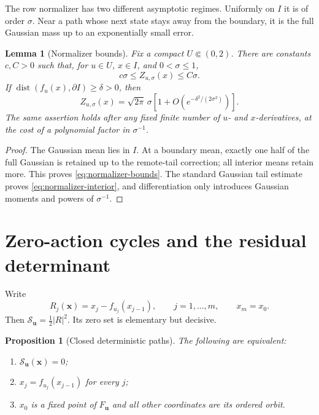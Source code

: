 \documentclass[11pt]{article}
\newtheorem{proposition}[theorem]{Proposition}
\newtheorem{lemma}[theorem]{Lemma}
\theoremstyle{remark}
\newcommand{\cS}{\mathcal S}
\newcommand{\bu}{\boldsymbol u}
\newcommand{\bx}{\boldsymbol x}
\begin{document}
The row normalizer has two different asymptotic regimes.  Uniformly on $I$ it
is of order $\sigma$.  Near a path whose next state stays away from the
boundary, it is the full Gaussian mass up to an exponentially small error.

\begin{lemma}[Normalizer bounds]
\label{lem:normalizer}
Fix a compact $U\Subset(0,2)$.  There are constants $c,C>0$ such that, for
$u\in U$, $x\in I$, and $0<\sigma\le1$,
\begin{equation}
 c\sigma\le Z_{u,\sigma}(x)\le C\sigma.
 \label{eq:normalizer-bounds}
\end{equation}
If $\operatorname{dist}(f_u(x),\partial I)\ge\delta>0$, then
\begin{equation}
 Z_{u,\sigma}(x)=\sqrt{2\pi}\,\sigma
 \left[1+O\left(e^{-\delta^2/(2\sigma^2)}\right)\right].
 \label{eq:normalizer-interior}
\end{equation}
The same assertion holds after any fixed finite number of $u$- and
$x$-derivatives, at the cost of a polynomial factor in $\sigma^{-1}$.
\end{lemma}

\begin{proof}
The Gaussian mean lies in $I$.  At a boundary mean, exactly one half of the
full Gaussian is retained up to the remote-tail correction; all interior means
retain more.  This proves \eqref{eq:normalizer-bounds}.  The standard Gaussian
tail estimate proves \eqref{eq:normalizer-interior}, and differentiation only
introduces Gaussian moments and powers of $\sigma^{-1}$.
\end{proof}

\section{Zero-action cycles and the residual determinant}
\label{sec:geometry}

Write
\begin{equation}
 R_j(\bx)=x_j-f_{u_j}(x_{j-1}),
 \qquad j=1,\ldots,m,\qquad x_m=x_0.
 \label{eq:residual}
\end{equation}
Then $\cS_{\bu}=\frac12|R|^2$.  Its zero set is elementary but decisive.

\begin{proposition}[Closed deterministic paths]
\label{prop:zero-set}
The following are equivalent:
\begin{enumerate}[label=(\roman*),leftmargin=2.2em]
 \item $\cS_{\bu}(\bx)=0$;
 \item $x_j=f_{u_j}(x_{j-1})$ for every $j$;
 \item $x_0$ is a fixed point of $F_{\bu}$ and all other coordinates are its
 ordered orbit.
\end{enumerate}
\end{proposition}
\end{document}
